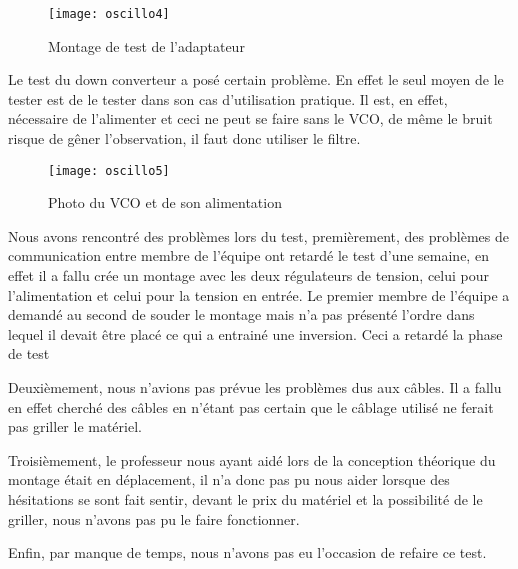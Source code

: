 \begin{figure}[h]
  \centering
  \texttt{[image: oscillo4]}
  \caption{Montage de test de l’adaptateur}
  \label{fig:mont}
\end{figure}


Le test du down converteur a posé certain problème. En effet le seul moyen de le tester est de le tester dans son cas d’utilisation pratique. Il est, en effet, nécessaire de l’alimenter et  ceci ne peut se faire sans le VCO, de même le bruit risque de gêner l’observation, il faut donc utiliser le filtre.


\begin{figure}[h]
  \centering
  \texttt{[image: oscillo5]}
  \caption{Photo du VCO et de son alimentation}
  \label{fig:photo}
\end{figure}



Nous avons rencontré des problèmes lors du test, premièrement, des problèmes de communication entre membre de l’équipe ont retardé le test d’une semaine, en effet il a fallu crée un montage avec les deux régulateurs de tension, celui pour l’alimentation et celui pour la tension en entrée. Le premier membre de l’équipe a demandé au second de souder le montage mais n’a pas présenté l’ordre dans lequel il devait être placé ce qui a entrainé une inversion. Ceci a retardé la phase de test

Deuxièmement, nous n’avions pas prévue les problèmes dus aux câbles. Il a fallu en effet cherché des câbles en n’étant pas certain que le câblage utilisé ne ferait pas griller le matériel.

Troisièmement, le professeur nous ayant aidé lors de la conception théorique du montage était en déplacement, il n’a donc pas pu nous aider lorsque des hésitations se sont fait sentir, devant le prix du matériel et la possibilité de le griller, nous n’avons pas pu le faire fonctionner.

Enfin, par manque de temps, nous n’avons pas eu l’occasion de refaire ce test.




